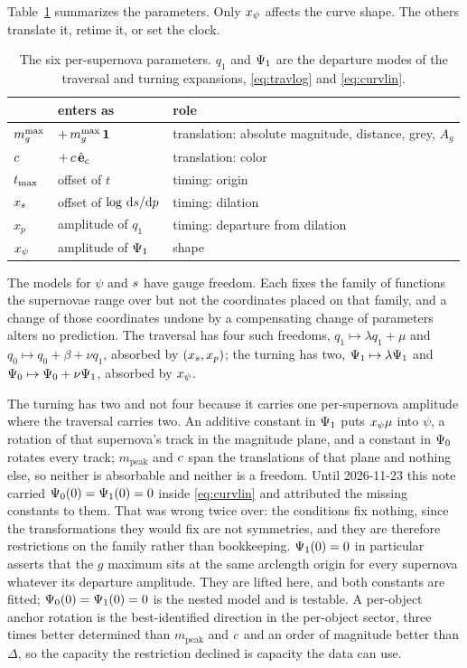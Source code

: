 \documentclass[11pt]{article}
\theoremstyle{plain}
\begin{document}
Table~\ref{tab:pars} summarizes the parameters.
Only $x_{\psi}$ affects the curve shape. The others translate it, retime it, or set the
clock.

\begin{table}[tb]
\centering
\caption{The six per-supernova parameters. $q_{1}$ and $\Psi_{1}$ are the departure modes
of the traversal and turning expansions, \eqref{eq:travlog} and \eqref{eq:curvlin}.}
\label{tab:pars}
\begin{tabular}{lll}
\toprule
 & enters as & role \\
\midrule
$m_{g}^{\max}$    & $+\,m_{g}^{\max}\,\mathbf{1}$ & translation: absolute magnitude, distance, grey, $A_{g}$ \\
$c$       & $+\,c\,\hat{\mathbf{e}}_{c}$ & translation: color \\
$t_{\mathrm{max}}$       & offset of $t$ & timing: origin \\
$x_{s}$   & offset of $\log\,\mathrm{d}s/\mathrm{d}p$ & timing: dilation \\
$x_p$         & amplitude of $q_{1}$ & timing: departure from dilation \\
$x_{\psi}$ & amplitude of $\Psi_{1}$ & shape \\
\bottomrule
\end{tabular}
\end{table}


The models for $\psi$ and $s$ have gauge freedom. Each fixes the family of functions the
supernovae range over but not the coordinates placed on that family, and a change of those
coordinates undone by a compensating change of parameters alters no prediction.
The traversal has
four such freedoms, $q_{1} \mapsto \lambda q_{1} + \mu$ and
$q_{0} \mapsto q_{0} + \beta + \nu q_{1}$, absorbed by $(x_{s}, x_p)$; the turning has
two, $\Psi_{1} \mapsto \lambda\Psi_{1}$ and
$\Psi_{0} \mapsto \Psi_{0} + \nu\Psi_{1}$, absorbed by $x_{\psi}$.

The turning has two and not four because it carries one per-supernova amplitude where the
traversal carries two. An additive constant in $\Psi_{1}$ puts $x_{\psi}\mu$ into $\psi$,
a rotation of that supernova's track in the magnitude plane, and a constant in $\Psi_{0}$
rotates every track; $m_{\mathrm{peak}}$ and $c$ span the translations of that plane
and nothing else, so neither is absorbable and neither is a freedom. Until
2026-11-23 this note carried $\Psi_{0}(0) = \Psi_{1}(0) = 0$ inside
\eqref{eq:curvlin} and attributed the missing constants to them. That was wrong twice
over: the conditions fix nothing, since the transformations they would fix are not
symmetries, and they are therefore restrictions on the family rather than bookkeeping.
$\Psi_{1}(0) = 0$ in particular asserts that the $g$ maximum sits at the same arclength
origin for every supernova whatever its departure amplitude. They are lifted here, and
both constants are fitted; $\Psi_{0}(0) = \Psi_{1}(0) = 0$ is the nested model and is
testable. A per-object anchor rotation is the best-identified direction in the per-object
sector, three times better determined than $m_{\mathrm{peak}}$ and $c$ and an order of
magnitude better than $\Delta$, so the capacity the restriction declined is capacity the
data can use.
\end{document}
